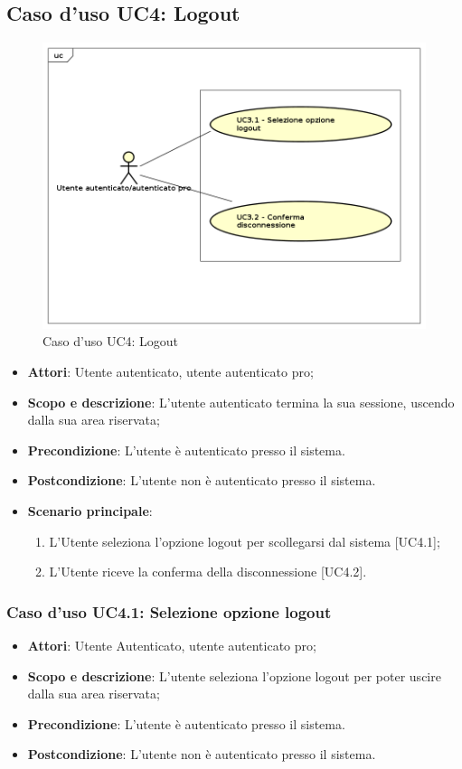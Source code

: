 \subsection{Caso d'uso UC4: Logout}
	\label{UC4}
	\begin{figure}[h]
		\centering
			\includegraphics[scale=0.45,keepaspectratio]{UML/UC4.png}
		\caption{Caso d'uso UC4: Logout}
	\end{figure}
	\FloatBarrier
	\begin{itemize}
		\item
			\textbf{Attori}: Utente autenticato, utente autenticato pro;
		\item		
			\textbf{Scopo e descrizione}: L'utente autenticato termina la sua sessione, uscendo dalla sua area riservata;
		\item
			\textbf{Precondizione}: L'utente è autenticato presso il sistema.
		\item
			\textbf{Postcondizione}: L'utente non è autenticato presso il sistema. 
		\item
			\textbf{Scenario principale}:
	       		\begin{enumerate}
					\item 	
					L'Utente seleziona l'opzione logout per scollegarsi dal sistema [UC4.1];
					\item
					L'Utente riceve la conferma della disconnessione [UC4.2].
	 			\end{enumerate}
	\end{itemize}

\subsubsection{Caso d'uso UC4.1: Selezione opzione logout}
	\begin{itemize}
		\item		
			\textbf{Attori}: Utente Autenticato, utente autenticato pro;
		\item
  			\textbf{Scopo e descrizione}: L'utente seleziona l'opzione logout per poter uscire dalla sua area riservata;
		\item
			\textbf{Precondizione}: L'utente è autenticato presso il sistema. 
		\item
			\textbf{Postcondizione}: L'utente non è autenticato presso il sistema.
	\end{itemize}
